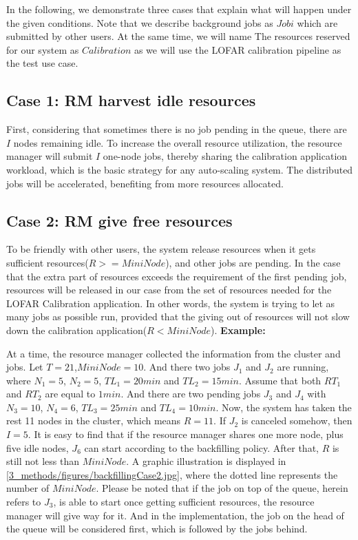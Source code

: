 In the following, we demonstrate three cases that explain what will happen under the given conditions. 
Note that we describe background jobs as $Job i$ which are submitted by other users.
At the same time, we will name The resources reserved for our system as $Calibration$ as we will use the LOFAR calibration pipeline as the test use case.

\subsection{Case 1: RM harvest idle resources }
First, considering that sometimes there is no job pending in the queue, there are $I$ nodes remaining idle.
To increase the overall resource utilization, the resource manager will submit $I$ one-node jobs, thereby sharing the calibration application workload, which is the basic strategy for any auto-scaling system. 
The distributed jobs will be accelerated, benefiting from more resources allocated.

\subsection{Case 2: RM give free resources}
To be friendly with other users, the system release resources when it gets sufficient resources($R>=MiniNode$), and other jobs are pending.
In the case that the extra part of resources exceeds the requirement of the first pending job, resources will be released in our case from the set of resources needed for the LOFAR Calibration application.
In other words, the system is trying to let as many jobs as possible run, provided that the giving out of resources will not slow down the calibration application($R<MiniNode$).
\textbf{Example:}

At a time, the resource manager collected the information from the cluster and jobs.
Let $T=21$,$MiniNode=10$. And there two jobs $J_{1}$ and $J_{2}$ are running, where $N_{1}=5$, $N_{2}=5$, $TL_{1}=20 min$ and $TL_{2}=15 min$.
Assume that both $RT_{1}$ and $RT_{2}$ are equal to $1 min$. And there are two pending jobs $J_{3}$ and $J_{4}$ with  $N_{3}=10$, $N_{4}=6$, $TL_{3}=25 min$ and $TL_{4}=10 min$.
Now, the system has taken the rest 11 nodes in the cluster, which means $R=11$.
If $J_{2}$ is canceled somehow, then $I=5$. It is easy to find that if the resource manager shares one more node, plus five idle nodes, $J_{6}$ can start according to the backfilling policy. 
After that, $R$ is still not less than $MiniNode$. A graphic illustration is displayed in \ref{3_methods/figures/backfillingCase2.jpg}, where the dotted line represents the number of $MiniNode$. 
Please be noted that if the job on top of the queue, herein refers to  $J_{3}$, is able to start once getting sufficient resources, the resource manager will give way for it. And in the implementation, the job on the head of the queue will be considered first, which is followed by the jobs behind.

